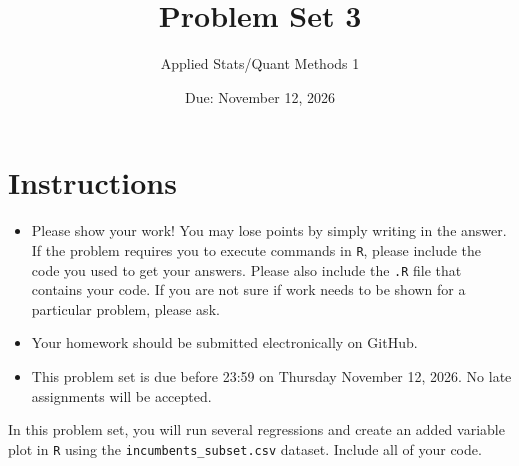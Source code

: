 \documentclass[12pt,letterpaper]{article}
\title{Problem Set 3}
\date{Due: November 12, 2026}
\author{Applied Stats/Quant Methods 1}
\begin{document}
	\maketitle
	\section*{Instructions}
	\begin{itemize}
		\item Please show your work! You may lose points by simply writing in the answer. If the problem requires you to execute commands in \texttt{R}, please include the code you used to get your answers. Please also include the \texttt{.R} file that contains your code. If you are not sure if work needs to be shown for a particular problem, please ask.
		\item Your homework should be submitted electronically on GitHub.
		\item This problem set is due before 23:59 on Thursday November 12, 2026. No late assignments will be accepted.
	\end{itemize}
	
	\vspace{.25cm}
	
	\noindent In this problem set, you will run several regressions and create an added variable plot in \texttt{R} using the \texttt{incumbents\_subset.csv} dataset. Include all of your code.
	
	\vspace{.5cm}
\end{document}
